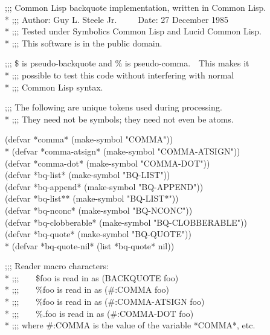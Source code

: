 \begin{new}
\begin{lisp}
;;; Common Lisp backquote implementation, written in Common Lisp. \\*
;;; Author: Guy L. Steele Jr.~~~~~Date: 27 December 1985 \\*
;;; Tested under Symbolics Common Lisp and Lucid Common Lisp. \\*
;;; This software is in the public domain.
\end{lisp}
\begin{lisp}
;;; \$ is pseudo-backquote and \% is pseudo-comma.~~This makes it \\*
;;; possible to test this code without interfering with normal \\*
;;; Common Lisp syntax.
\end{lisp}
\begin{lisp}
;;; The following are unique tokens used during processing. \\*
;;; They need not be symbols; they need not even be atoms.
\end{lisp}
\begin{lisp}
(defvar *comma* (make-symbol "COMMA")) \\*
(defvar *comma-atsign* (make-symbol "COMMA-ATSIGN")) \\
(defvar *comma-dot* (make-symbol "COMMA-DOT")) \\
(defvar *bq-list* (make-symbol "BQ-LIST")) \\
(defvar *bq-append* (make-symbol "BQ-APPEND")) \\
(defvar *bq-list** (make-symbol "BQ-LIST*")) \\
(defvar *bq-nconc* (make-symbol "BQ-NCONC")) \\
(defvar *bq-clobberable* (make-symbol "BQ-CLOBBERABLE")) \\
(defvar *bq-quote* (make-symbol "BQ-QUOTE")) \\*
(defvar *bq-quote-nil* (list *bq-quote* nil))
\end{lisp}
\begin{lisp}
;;; Reader macro characters: \\*
;;;~~~~\$foo is read in as (BACKQUOTE foo) \\*
;;;~~~~\%foo is read in as (\#:COMMA foo) \\*
;;;~~~~\%{\Xatsign}foo is read in as (\#:COMMA-ATSIGN foo) \\*
;;;~~~~\%.foo is read in as (\#:COMMA-DOT foo) \\*
;;; where \#:COMMA is the value of the variable *COMMA*, etc.
\end{lisp}

\end{new}
